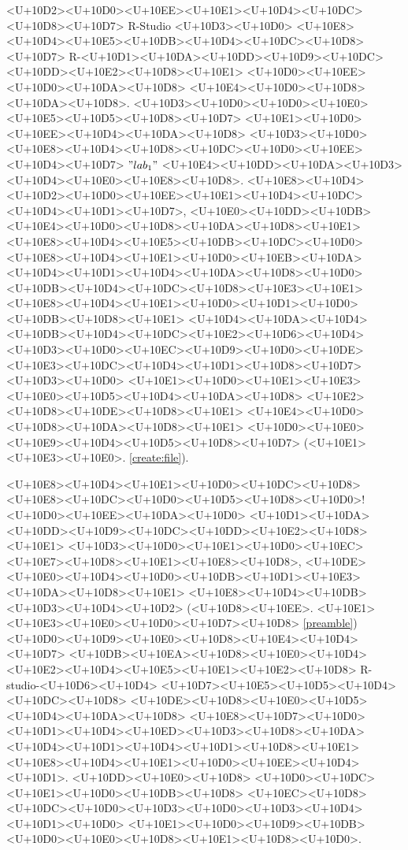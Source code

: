 \documentclass{article}
\begin{document}
<U+10D2><U+10D0><U+10EE><U+10E1><U+10D4><U+10DC><U+10D8><U+10D7> R-Studio <U+10D3><U+10D0> <U+10E8><U+10D4><U+10E5><U+10DB><U+10D4><U+10DC><U+10D8><U+10D7> R-<U+10D1><U+10DA><U+10DD><U+10D9><U+10DC><U+10DD><U+10E2><U+10D8><U+10E1> <U+10D0><U+10EE><U+10D0><U+10DA><U+10D8> <U+10E4><U+10D0><U+10D8><U+10DA><U+10D8>. <U+10D3><U+10D0><U+10D0><U+10E0><U+10E5><U+10D5><U+10D8><U+10D7> <U+10E1><U+10D0><U+10EE><U+10D4><U+10DA><U+10D8> <U+10D3><U+10D0> <U+10E8><U+10D4><U+10D8><U+10DC><U+10D0><U+10EE><U+10D4><U+10D7> $"lab_1"$ <U+10E4><U+10DD><U+10DA><U+10D3><U+10D4><U+10E0><U+10E8><U+10D8>. <U+10E8><U+10D4><U+10D2><U+10D0><U+10EE><U+10E1><U+10D4><U+10DC><U+10D4><U+10D1><U+10D7>, <U+10E0><U+10DD><U+10DB> <U+10E4><U+10D0><U+10D8><U+10DA><U+10D8><U+10E1> <U+10E8><U+10D4><U+10E5><U+10DB><U+10DC><U+10D0> <U+10E8><U+10D4><U+10E1><U+10D0><U+10EB><U+10DA><U+10D4><U+10D1><U+10D4><U+10DA><U+10D8><U+10D0> <U+10DB><U+10D4><U+10DC><U+10D8><U+10E3><U+10E1> <U+10E8><U+10D4><U+10E1><U+10D0><U+10D1><U+10D0><U+10DB><U+10D8><U+10E1> <U+10D4><U+10DA><U+10D4><U+10DB><U+10D4><U+10DC><U+10E2><U+10D6><U+10D4> <U+10D3><U+10D0><U+10EC><U+10D9><U+10D0><U+10DE><U+10E3><U+10DC><U+10D4><U+10D1><U+10D8><U+10D7> <U+10D3><U+10D0> <U+10E1><U+10D0><U+10E1><U+10E3><U+10E0><U+10D5><U+10D4><U+10DA><U+10D8> <U+10E2><U+10D8><U+10DE><U+10D8><U+10E1> <U+10E4><U+10D0><U+10D8><U+10DA><U+10D8><U+10E1> <U+10D0><U+10E0><U+10E9><U+10D4><U+10D5><U+10D8><U+10D7> (<U+10E1><U+10E3><U+10E0>. \ref{create:file}).



<U+10E8><U+10D4><U+10E1><U+10D0><U+10DC><U+10D8><U+10E8><U+10DC><U+10D0><U+10D5><U+10D8><U+10D0>! <U+10D0><U+10EE><U+10DA><U+10D0> <U+10D1><U+10DA><U+10DD><U+10D9><U+10DC><U+10DD><U+10E2><U+10D8><U+10E1> <U+10D3><U+10D0><U+10E1><U+10D0><U+10EC><U+10E7><U+10D8><U+10E1><U+10E8><U+10D8>, <U+10DE><U+10E0><U+10D4><U+10D0><U+10DB><U+10D1><U+10E3><U+10DA><U+10D8><U+10E1> <U+10E8><U+10D4><U+10DB><U+10D3><U+10D4><U+10D2> (<U+10D8><U+10EE>. <U+10E1><U+10E3><U+10E0><U+10D0><U+10D7><U+10D8> \ref{preamble}) <U+10D0><U+10D9><U+10E0><U+10D8><U+10E4><U+10D4><U+10D7> <U+10DB><U+10EA><U+10D8><U+10E0><U+10D4> <U+10E2><U+10D4><U+10E5><U+10E1><U+10E2><U+10D8> R-studio-<U+10D6><U+10D4> <U+10D7><U+10E5><U+10D5><U+10D4><U+10DC><U+10D8> <U+10DE><U+10D8><U+10E0><U+10D5><U+10D4><U+10DA><U+10D8> <U+10E8><U+10D7><U+10D0><U+10D1><U+10D4><U+10ED><U+10D3><U+10D8><U+10DA><U+10D4><U+10D1><U+10D4><U+10D1><U+10D8><U+10E1> <U+10E8><U+10D4><U+10E1><U+10D0><U+10EE><U+10D4><U+10D1>. <U+10DD><U+10E0><U+10D8> <U+10D0><U+10DC> <U+10E1><U+10D0><U+10DB><U+10D8> <U+10EC><U+10D8><U+10DC><U+10D0><U+10D3><U+10D0><U+10D3><U+10D4><U+10D1><U+10D0> <U+10E1><U+10D0><U+10D9><U+10DB><U+10D0><U+10E0><U+10D8><U+10E1><U+10D8><U+10D0>.
\end{document}
